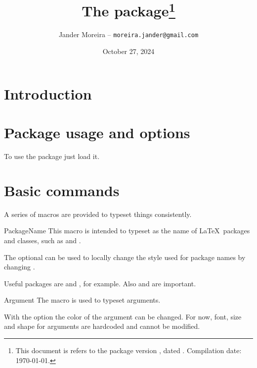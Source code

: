 \documentclass[11pt, outputdir = ./out]{article}
\title{The \PackageName{docs} package\footnote{This document is refers to the package version \DocsVersion, dated \DocsDate. Compilation date: \today.}}
\author{Jander Moreira -- \texttt{moreira.jander@gmail.com}}
\date{October 27, 2024}
\begin{document}
\maketitle

\tableofcontents


\section{Introduction}


\section{Package usage and options}
To use the  package just load it.

\begin{latexcode}
    \usepackage{docs}
\end{latexcode}


\section{Basic commands}

A series of macros are provided to typeset things consistently.

\begin{Macrodef}{PackageName}{}{}
    This macro is intended to typeset  as the name of \LaTeX\ packages and classes, such as  and .

    The optional  can be used to locally change the style used for package names by changing .
\end{Macrodef}

\begin{example}{}
    Useful packages are  and , for example. Also  and  are important.
\end{example}

\begin{Macrodef}{Argument}{}{}
    The  macro is used to typeset arguments.

    With the option  the color of the argument can be changed. For now, font, size and shape for arguments are hardcoded and cannot be modified.
\end{Macrodef}
\end{document}
